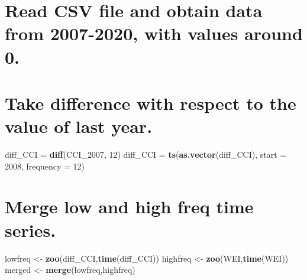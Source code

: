 \documentclass[]{article}
\newenvironment{Shaded}{\begin{snugshade}}{\end{snugshade}}
\newcommand{\KeywordTok}[1]{\textcolor[rgb]{0.13,0.29,0.53}{\textbf{#1}}}
\newcommand{\DataTypeTok}[1]{\textcolor[rgb]{0.13,0.29,0.53}{#1}}
\newcommand{\DecValTok}[1]{\textcolor[rgb]{0.00,0.00,0.81}{#1}}
\newcommand{\StringTok}[1]{\textcolor[rgb]{0.31,0.60,0.02}{#1}}
\newcommand{\OperatorTok}[1]{\textcolor[rgb]{0.81,0.36,0.00}{\textbf{#1}}}
\newcommand{\NormalTok}[1]{#1}
\begin{document}
\section{Read CSV file and obtain data from 2007-2020, with values
around
0.}\label{read-csv-file-and-obtain-data-from-2007-2020-with-values-around-0.}

\begin{Shaded}
\end{Shaded}

\section{Take difference with respect to the value of last
year.}\label{take-difference-with-respect-to-the-value-of-last-year.}

\begin{Shaded}
\begin{Highlighting}[]
\NormalTok{diff_CCI =}\StringTok{ }\KeywordTok{diff}\NormalTok{(CCI_}\DecValTok{2007}\NormalTok{, }\DecValTok{12}\NormalTok{)}
\NormalTok{diff_CCI =}\StringTok{ }\KeywordTok{ts}\NormalTok{(}\KeywordTok{as.vector}\NormalTok{(diff_CCI), }\DataTypeTok{start =} \DecValTok{2008}\NormalTok{, }\DataTypeTok{frequency =} \DecValTok{12}\NormalTok{)}
\end{Highlighting}
\end{Shaded}

\section{Merge low and high freq time
series.}\label{merge-low-and-high-freq-time-series.}

\begin{Shaded}
\begin{Highlighting}[]
\NormalTok{lowfreq      <-}\StringTok{ }\KeywordTok{zoo}\NormalTok{(diff_CCI,}\KeywordTok{time}\NormalTok{(diff_CCI))}
\NormalTok{highfreq     <-}\StringTok{ }\KeywordTok{zoo}\NormalTok{(WEI,}\KeywordTok{time}\NormalTok{(WEI))}
\NormalTok{merged       <-}\StringTok{ }\KeywordTok{merge}\NormalTok{(lowfreq,highfreq)}
\end{Highlighting}
\end{Shaded}
\end{document}
